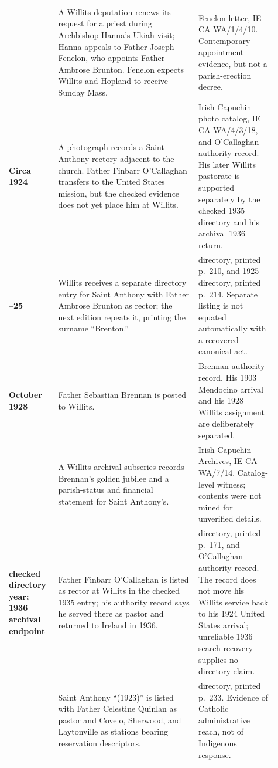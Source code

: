 \begin{longtable}{>{\bfseries\RaggedRight\arraybackslash}p{0.16\linewidth}>{\RaggedRight\arraybackslash}p{0.48\linewidth}>{\RaggedRight\arraybackslash}p{0.27\linewidth}}
[June] 1923 & A Willits deputation renews its request for a priest during Archbishop Hanna's Ukiah visit; Hanna appeals to Father Joseph Fenelon, who appoints Father Ambrose Brunton. Fenelon expects Willits and Hopland to receive Sunday Mass. & Fenelon letter, IE CA WA/1/4/10. Contemporary appointment evidence, but not a parish-erection decree.\\

Circa 1924 & A photograph records a Saint Anthony rectory adjacent to the church. Father Finbarr O'Callaghan transfers to the United States mission, but the checked evidence does not yet place him at Willits. & Irish Capuchin photo catalog, IE CA WA/4/3/18, and O'Callaghan authority record. His later Willits pastorate is supported separately by the checked 1935 directory and his archival 1936 return.\\

1924--25 & Willits receives a separate directory entry for Saint Anthony with Father Ambrose Brunton as rector; the next edition repeats it, printing the surname ``Brenton.'' & 1924 directory, printed p.~210, and 1925 directory, printed p.~214. Separate listing is not equated automatically with a recovered canonical act.\\

October 1928 & Father Sebastian Brennan is posted to Willits. & Brennan authority record. His 1903 Mendocino arrival and his 1928 Willits assignment are deliberately separated.\\

1929 & A Willits archival subseries records Brennan's golden jubilee and a parish-status and financial statement for Saint Anthony's. & Irish Capuchin Archives, IE CA WA/7/14. Catalog-level witness; contents were not mined for unverified details.\\

1935 checked directory year; 1936 archival endpoint & Father Finbarr O'Callaghan is listed as rector at Willits in the checked 1935 entry; his authority record says he served there as pastor and returned to Ireland in 1936. & 1935 directory, printed p.~171, and O'Callaghan authority record. The record does not move his Willits service back to his 1924 United States arrival; unreliable 1936 search recovery supplies no directory claim.\\

1941 & Saint Anthony ``(1923)'' is listed with Father Celestine Quinlan as pastor and Covelo, Sherwood, and Laytonville as stations bearing reservation descriptors. & 1941 directory, printed p.~233. Evidence of Catholic administrative reach, not of Indigenous response.\\


\end{longtable}
